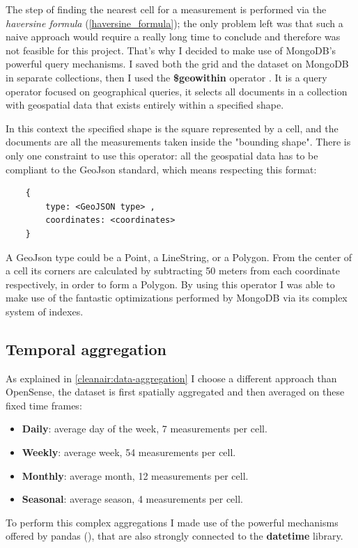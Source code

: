 \documentclass[11pt,a4paper,titlepage]{book}
\begin{document}
The step of finding the nearest cell for a measurement is performed via the \textit{haversine formula} (\ref{haversine_formula}); the only problem left was that such a naive approach would require a really long time to conclude and therefore was not feasible for this project. That's why I decided to make use of MongoDB's powerful query mechanisms.
\newline
\newline
I saved both the grid and the dataset on MongoDB in separate collections, then I used the \textbf{\$geowithin} operator \cite{mongodb-geowithin}. It is a query operator focused on geographical queries, it selects all documents in a collection with geospatial data that exists entirely within a specified shape.

In this context the specified shape is the square represented by a cell, and the documents are all the measurements taken inside the "bounding shape".
\newline
\newline
There is only one constraint to use this operator: all the geospatial data has to be compliant to the GeoJson standard, which means respecting this format:
\begin{verbatim}
    {
        type: <GeoJSON type> , 
        coordinates: <coordinates>
    }
\end{verbatim}
A GeoJson type could be a Point, a LineString, or a Polygon. From the center of a cell its corners are calculated by subtracting 50 meters from each coordinate respectively, in order to form a Polygon.
\newline
\newline
By using this operator I was able to make use of the fantastic optimizations performed by MongoDB via its complex system of indexes.

\subsection{Temporal aggregation}
As explained in \ref{cleanair:data-aggregation} I choose a different approach than OpenSense, the dataset is first spatially aggregated and then averaged on these fixed time frames:
\begin{itemize}
    \item \textbf{Daily}: average day of the week, 7 measurements per cell.
    \item \textbf{Weekly}: average week, 54 measurements per cell.
    \item \textbf{Monthly}: average month, 12 measurements per cell.
    \item \textbf{Seasonal}: average season, 4 measurements per cell.
\end{itemize}
To perform this complex aggregations I made use of the powerful mechanisms offered by pandas (\cite{pandas-aggregation}), that are also strongly connected to the \textbf{datetime} library.
\end{document}
